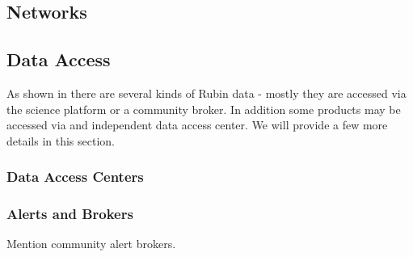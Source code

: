 \subsection{Networks} \label{sec:network}

\subsection{Data Access} \label{sec:dataaccess}

As shown in  there are several kinds of Rubin data - mostly they are accessed via
the science platform or a community broker.
In addition some products may be accessed via and independent data access center. We will provide a few more details in this section.

\subsubsection{Data Access Centers}

\subsubsection{Alerts and Brokers}
Mention community alert brokers.
